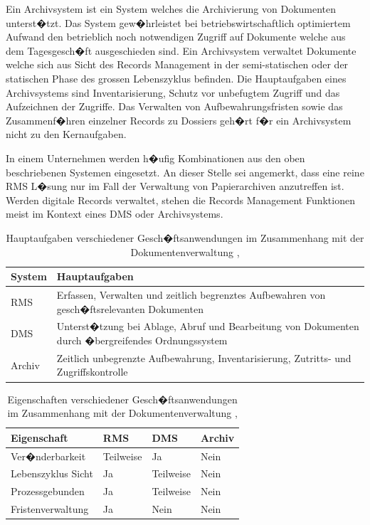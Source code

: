 \documentclass[a4paper,twoside,10pt]{report}
\begin{document}
Ein Archivsystem ist ein System welches die Archivierung von Dokumenten unterst�tzt. Das System gew�hrleistet bei betriebswirtschaftlich optimiertem Aufwand den betrieblich noch notwendigen Zugriff auf Dokumente welche aus dem Tagesgesch�ft ausgeschieden sind. Ein Archivsystem verwaltet Dokumente welche sich aus Sicht des Records Management in der semi-statischen oder der statischen Phase des grossen Lebenszyklus befinden. Die Hauptaufgaben eines Archivsystems sind Inventarisierung, Schutz vor unbefugtem Zugriff und das Aufzeichnen der Zugriffe. Das Verwalten von Aufbewahrungsfristen sowie das Zusammenf�hren einzelner Records zu Dossiers geh�rt f�r ein Archivsystem nicht zu den Kernaufgaben.\cite{krm}

In einem Unternehmen werden h�ufig Kombinationen aus den oben beschriebenen Systemen eingesetzt. An dieser Stelle sei angemerkt, dass eine reine \ac{RMS} L�sung nur im Fall der Verwaltung von Papierarchiven anzutreffen ist. Werden digitale Records verwaltet, stehen die Records Management Funktionen meist im Kontext eines \ac{DMS} oder Archivsystems. \cite{krm}

\begin{table}[htb]
\begin{tabular}{p{2.5cm}|p{8cm}}
\hline
 \textbf{System} & \textbf{Hauptaufgaben} \\
\hline
\ac{RMS} & Erfassen, Verwalten und zeitlich begrenztes Aufbewahren von gesch�ftsrelevanten Dokumenten\\
\hline
\ac{DMS} & Unterst�tzung bei Ablage, Abruf und Bearbeitung von Dokumenten durch �bergreifendes Ordnungssystem\\
\hline
Archiv & Zeitlich unbegrenzte Aufbewahrung, Inventarisierung, Zutritts- und Zugriffskontrolle \\
\hline
\end{tabular}
\caption{Hauptaufgaben verschiedener Gesch�ftsanwendungen im Zusammenhang mit der Dokumentenverwaltung \cite{krm}, \cite{rmGest}}
\label{tab:systeme}
\end{table}

\begin{table}[htb]
\begin{tabular}{l||l|l|l}
\hline
 \textbf{Eigenschaft} & \textbf{\ac{RMS}}  & \textbf{\ac{DMS}}& \textbf{Archiv}\\
\hline
Ver�nderbarkeit & Teilweise & Ja & Nein\\
\hline
Lebenszyklus Sicht & Ja & Teilweise & Nein\\
\hline
Prozessgebunden & Ja & Teilweise & Nein \\
\hline
Fristenverwaltung & Ja & Nein & Nein \\
\hline
\end{tabular}
\caption{Eigenschaften verschiedener Gesch�ftsanwendungen im Zusammenhang mit der Dokumentenverwaltung \cite{krm}, \cite{rmGest}}
\label{tab:systemeigen}
\end{table}
\end{document}
